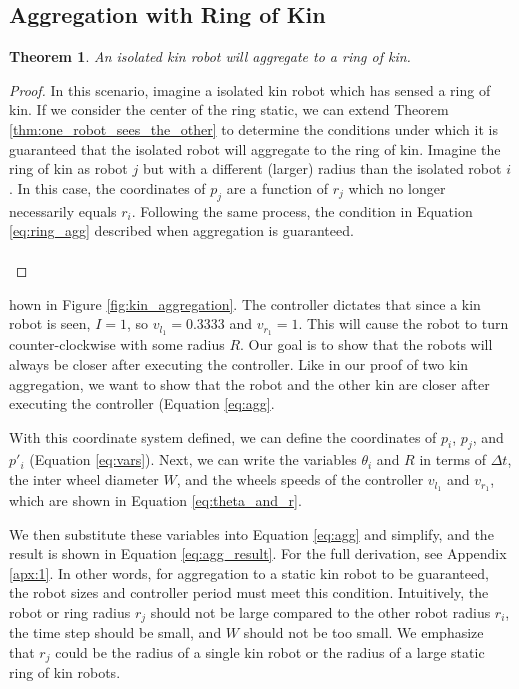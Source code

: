 \documentclass[conference]{IEEEtran}
\newtheorem{theorem}{Theorem}
\begin{document}
  \subsection{Aggregation with Ring of Kin}

    \begin{theorem} \label{thm:aggregation_with_ring_of_kin}
      An isolated kin robot will aggregate to a ring of kin.
    \end{theorem}
    \begin{proof}

      In this scenario, imagine a isolated kin robot which has sensed a ring of kin. If we consider the center of the ring static, we can extend Theorem \ref{thm:one_robot_sees_the_other} to determine the conditions under which it is guaranteed that the isolated robot will aggregate to the ring of kin. Imagine the ring of kin as robot $j$ but with a different (larger) radius than the isolated robot $i$. In this case, the coordinates of $p_j$ are a function of $r_j$ which no longer necessarily equals $r_i$. Following the same process, the condition in Equation \eqref{eq:ring_agg} described when aggregation is guaranteed.

      \begin{equation} \label{eq:ring_agg}
        \begin{split}
        \end{split}
      \end{equation}

      \end{proof}

     hown in Figure \ref{fig:kin_aggregation}. The controller dictates that since a kin robot is seen, $I=1$, so $v_{l_1} = 0.3333$ and $v_{r_1} = 1$. This will cause the robot to turn counter-clockwise with some radius $R$. Our goal is to show that the robots will always be closer after executing the controller. Like in our proof of two kin aggregation, we want to show that the robot and the other kin are closer after executing the controller (Equation \eqref{eq:agg}.

    With this coordinate system defined, we can define the coordinates of $p_i$, $p_j$, and $p'_i$ (Equation \eqref{eq:vars}). Next, we can write the variables $\theta_i$ and $R$ in terms of $\Delta t$, the inter wheel diameter $W$, and the wheels speeds of the controller $v_{l_1}$ and $v_{r_1}$, which are shown in Equation \eqref{eq:theta_and_r}.

    We then substitute these variables into Equation \eqref{eq:agg} and simplify, and the result is shown in Equation \eqref{eq:agg_result}. For the full derivation, see Appendix \ref{apx:1}. In other words, for aggregation to a static kin robot to be guaranteed, the robot sizes and controller period must meet this condition. Intuitively, the robot or ring radius $r_j$ should not be large compared to the other robot radius $r_i$, the time step should be small, and $W$ should not be too small. We emphasize that $r_j$ could be the radius of a single kin robot or the radius of a large static ring of kin robots.
\end{document}
